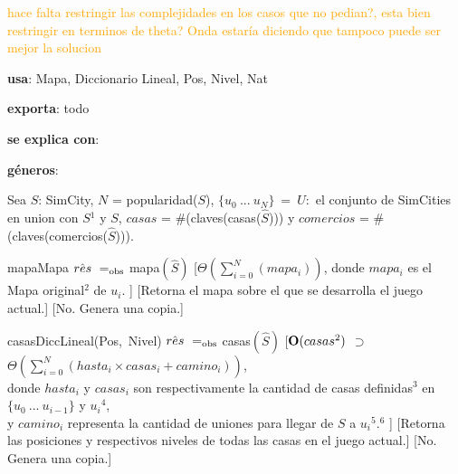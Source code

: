 \begin{Interfaz}

    \textcolor{orange}{hace falta restringir las complejidades en los casos que no pedian?,
    esta bien restringir en terminos de theta? Onda estaría diciendo que tampoco puede ser mejor la solucion}

    \textbf{usa}: Mapa, Diccionario Lineal, Pos, Nivel, Nat 
    
    \textbf{exporta}: todo

    \textbf{se explica con}: 
  
    \textbf{géneros}: 
    
    
    Sea $S$: SimCity, $N$ = popularidad($S$), $\{u_0\ ...\ u_{N}\}\ =\ U:$ el conjunto de SimCities en union con $S$$^{1}$ y $S$, \indent
    $casas$ = \#(claves(casas($\hat{S}$))) y $comercios$ = \#(claves(comercios($\hat{S}$))).

    \InterfazFuncion
    {mapa}{}{Mapa}
    {$\hat{res}\ \igobs\ $mapa$(\hat{S})$}
    [$\Theta(\sum_{i = 0}^{N}{}(mapa_i))$,
        donde $mapa_i$ es el Mapa original$^{2}$ de $u_i$.
    ]
    [Retorna el mapa sobre el que se desarrolla el juego actual.]
    [No. Genera una copia.]

    \InterfazFuncion
    {casas}{}{DiccLineal(Pos,\ Nivel)}
    {$\hat{res}\ \igobs\ $casas$(\hat{S})$}
    [$\bold{O}(casas^{2})$ $\supset$ $\Theta(\sum_{i = 0}^{N}{(hasta_i \times casas_i + camino_i)})$, 
        \\ \tab donde $hasta_i$ y $casas_i$ son respectivamente la cantidad de casas definidas$^{3}$ en $\{u_0\ ...\ u_{i - 1}\}$ y $u_i$$^{4}$, 
        \\ \tab y $camino_i$ representa la cantidad de uniones para llegar de $S$ a $u_i$$^{5}$.$^{6}$
    ]
    [Retorna las posiciones y respectivos niveles de todas las casas en el juego actual.]
    [No. Genera una copia.]


\end{Interfaz}
